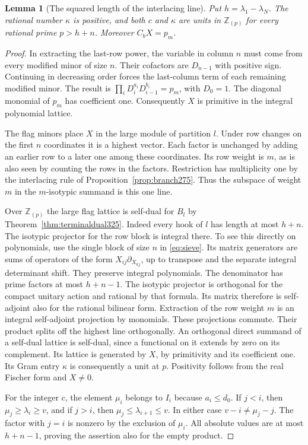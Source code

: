 \documentclass[a4paper,11pt]{article}
\newtheorem{lemma}[proposition]{Lemma}
\theoremstyle{definition}
\theoremstyle{remark}
\numberwithin{equation}{section}
\begin{document}
\begin{lemma}[The squared length of the interlacing line]\leavevmode
\label{lem:highestline347}
Put \(h=\lambda_1-\lambda_N\). The rational number \(\kappa\)
is positive, and both \(c\) and \(\kappa\) are units in
\(\mathbb Z_{(p)}\) for every rational prime \(p>h+n\).
Moreover \(C_bX=p_m\).
\end{lemma}
\begin{proof}
In extracting the last-row power, the variable in column \(n\) must
come from every modified minor of size \(n\). Their cofactors are
\(D_{n-1}\) with positive sign. Continuing in decreasing order
forces the last-column term of each remaining modified minor.
The result is \(\prod_iD_i^{a_i}D_{i-1}^{b_i}=p_m\), with
\(D_0=1\). The diagonal monomial of \(p_m\) has coefficient one.
Consequently \(X\) is primitive in the integral polynomial lattice.

The flag minors place \(X\) in the large module of partition \(l\).
Under row changes on the first \(n\) coordinates it is a highest
vector. Each factor is unchanged by adding an earlier row to a
later one among these coordinates. Its row weight is \(m\), as is
also seen by counting the rows in the factors. Restriction has
multiplicity one by the interlacing rule of
Proposition~\ref{prop:branch275}. Thus the subspace of weight \(m\)
in the \(m\)-isotypic summand is this one line.

Over \(\mathbb Z_{(p)}\) the large flag lattice is self-dual for
\(B_l\) by Theorem~\ref{thm:terminaldual325}. Indeed every hook
of \(l\) has length at most \(h+n\).
The isotypic projector for the row block is integral there. To
see this directly on polynomials, use the single block of size \(n\)
in \eqref{eq:sieve}. Its matrix generators are sums of operators
of the form \(X_{ij}\partial_{X_{kj}}\), up to transpose and
the separate integral determinant shift. They preserve integral
polynomials. The denominator has prime factors at most \(h+n-1\).
The isotypic projector is orthogonal for the compact unitary
action and rational by that formula. Its matrix therefore is
self-adjoint also for the rational bilinear form. Extraction of
the row weight \(m\) is an integral self-adjoint projection
by monomials. These projections commute. Their product splits
off the highest line orthogonally. An orthogonal direct summand
of a self-dual lattice is self-dual, since a functional on it
extends by zero on its complement. Its lattice is generated
by \(X\), by primitivity and its coefficient one. Its Gram
entry \(\kappa\) is consequently a unit at \(p\).
Positivity follows from the real Fischer form and \(X\ne0\).

For the integer \(c\), the element \(\mu_i\) belongs to \(I_i\)
because \(a_i\le d_0\). If \(j<i\), then
\(\mu_j\ge\lambda_i\ge v\), and if \(j>i\), then
\(\mu_j\le\lambda_{i+1}\le v\). In either case
\(v-i\ne\mu_j-j\). The factor with \(j=i\) is nonzero by
the exclusion of \(\mu_i\). All absolute values are at most
\(h+n-1\), proving the assertion also for the empty product.
\end{proof}
\end{document}

